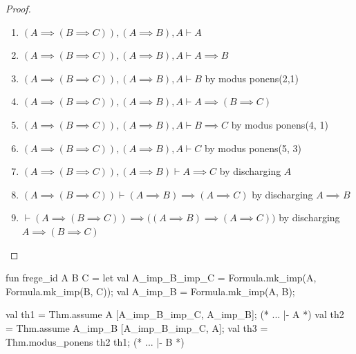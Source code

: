 \begin{proof}
\begin{enumerate}
\item $(A\implies(B\implies C)), (A\implies B), A\vdash A$
\item $(A\implies(B\implies C)), (A\implies B), A\vdash A\implies B$
\item $(A\implies(B\implies C)), (A\implies B), A\vdash B$ by modus ponens(2,1)
\item $(A\implies(B\implies C)), (A\implies B), A\vdash A\implies(B\implies C)$
\item $(A\implies(B\implies C)), (A\implies B), A\vdash B\implies C$
  by modus ponens(4, 1)
\item $(A\implies(B\implies C)), (A\implies B), A\vdash C$
  by modus ponens(5, 3)
\item $(A\implies(B\implies C)), (A\implies B)\vdash A\implies C$
  by discharging $A$
\item $(A\implies(B\implies C))\vdash (A\implies B)\implies(A\implies C)$
  by discharging $A\implies B$
\item $\vdash(A\implies(B\implies C))\implies\bigl((A\implies B)\implies(A\implies C)\bigr)$
  by discharging $A\implies(B\implies C)$\qedhere
\end{enumerate}
\end{proof}

\nwenddocs{}\endmoddef\nwstartdeflinemarkup{}\nwenddeflinemarkup
fun frege_id A B C =
  let
    val A_imp_B_imp_C = Formula.mk_imp(A, Formula.mk_imp(B, C));
    val A_imp_B = Formula.mk_imp(A, B);

    val th1 = Thm.assume A [A_imp_B_imp_C, A_imp_B]; (* ... |- A *)
    val th2 = Thm.assume A_imp_B [A_imp_B_imp_C, A];
    val th3 = Thm.modus_ponens th2 th1; (* ... |- B *)
    
